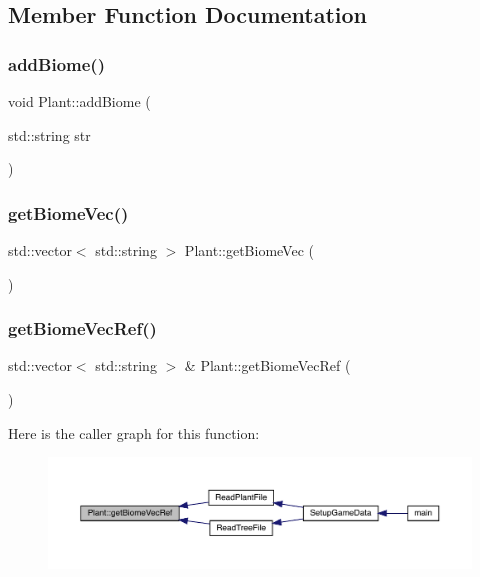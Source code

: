 \subsection{Member Function Documentation}
\mbox{\label{class_plant_a32c7cc807dce6f0049fec8a8576a341d}} 
\subsubsection{\texorpdfstring{add\+Biome()}{addBiome()}}
{\footnotesize\ttfamily void Plant\+::add\+Biome (\begin{DoxyParamCaption}\item[{std\+::string}]{str }\end{DoxyParamCaption})}

\mbox{\label{class_plant_a1c0df266a43944cb5f0565c298259340}} 
\subsubsection{\texorpdfstring{get\+Biome\+Vec()}{getBiomeVec()}}
{\footnotesize\ttfamily std\+::vector$<$ std\+::string $>$ Plant\+::get\+Biome\+Vec (\begin{DoxyParamCaption}{ }\end{DoxyParamCaption})}

\mbox{\label{class_plant_aa8d8046f942713a0d455accd0f86509f}} 
\subsubsection{\texorpdfstring{get\+Biome\+Vec\+Ref()}{getBiomeVecRef()}}
{\footnotesize\ttfamily std\+::vector$<$ std\+::string $>$ \& Plant\+::get\+Biome\+Vec\+Ref (\begin{DoxyParamCaption}{ }\end{DoxyParamCaption})}

Here is the caller graph for this function\+:
\nopagebreak
\begin{figure}[H]
\begin{center}
\leavevmode
\includegraphics[width=350pt]{class_plant_aa8d8046f942713a0d455accd0f86509f_icgraph}
\end{center}
\end{figure}
\mbox{\label{class_plant_a76c9434c2b7f9a9edad3e07db344ce0f}} 
